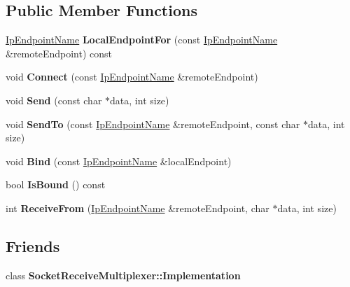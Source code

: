 \subsection*{Public Member Functions}
\begin{DoxyCompactItemize}
\item 
\mbox{\label{class_udp_socket_af34fd29cb98cd18b05cb74906080271a}} 
\hyperlink{class_ip_endpoint_name}{Ip\+Endpoint\+Name} {\bfseries Local\+Endpoint\+For} (const \hyperlink{class_ip_endpoint_name}{Ip\+Endpoint\+Name} \&remote\+Endpoint) const
\item 
\mbox{\label{class_udp_socket_ac1414f4e358ac79fa05d59c6ebd943e9}} 
void {\bfseries Connect} (const \hyperlink{class_ip_endpoint_name}{Ip\+Endpoint\+Name} \&remote\+Endpoint)
\item 
\mbox{\label{class_udp_socket_acb0e80c3fe7f6c37810e4e9632727ed3}} 
void {\bfseries Send} (const char $\ast$data, int size)
\item 
\mbox{\label{class_udp_socket_ad8d2fdc7aca43947f8e5f7ea37b5e01d}} 
void {\bfseries Send\+To} (const \hyperlink{class_ip_endpoint_name}{Ip\+Endpoint\+Name} \&remote\+Endpoint, const char $\ast$data, int size)
\item 
\mbox{\label{class_udp_socket_a9979c7040f6ec8badecb645cdfe72ac8}} 
void {\bfseries Bind} (const \hyperlink{class_ip_endpoint_name}{Ip\+Endpoint\+Name} \&local\+Endpoint)
\item 
\mbox{\label{class_udp_socket_af60e6cf0f34ffa47f9028e05ff197ded}} 
bool {\bfseries Is\+Bound} () const
\item 
\mbox{\label{class_udp_socket_a0215881023ce0e48e7bff9b6fb4209e3}} 
int {\bfseries Receive\+From} (\hyperlink{class_ip_endpoint_name}{Ip\+Endpoint\+Name} \&remote\+Endpoint, char $\ast$data, int size)
\end{DoxyCompactItemize}
\subsection*{Friends}
\begin{DoxyCompactItemize}
\item 
\mbox{\label{class_udp_socket_a6f4cdbff90b333b29915411c057569ef}} 
class {\bfseries Socket\+Receive\+Multiplexer\+::\+Implementation}
\end{DoxyCompactItemize}


